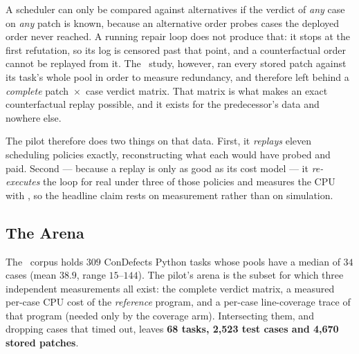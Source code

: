 A scheduler can only be compared against alternatives if the verdict of
\emph{any} case on \emph{any} patch is known, because an alternative order
probes cases the deployed order never reached. A running repair loop does not
produce that: it stops at the first refutation, so its log is censored past
that point, and a counterfactual order cannot be replayed from it. The
\cegmem\ study, however, ran every stored patch against its task's whole pool
in order to measure redundancy, and therefore left behind a \emph{complete}
patch~$\times$~case verdict matrix. That matrix is what makes an exact
counterfactual replay possible, and it exists for the predecessor's data and
nowhere else.

The pilot therefore does two things on that data. First, it \emph{replays}
eleven scheduling policies exactly, reconstructing what each would have probed
and paid. Second --- because a replay is only as good as its cost model --- it
\emph{re-executes} the loop for real under three of those policies and
measures the CPU with , so the headline claim rests on
measurement rather than on simulation.

\subsection{The Arena}
\label{sec:pilot-arena}

The \cegmem\ corpus holds $309$ ConDefects Python tasks whose pools have a
median of $34$ cases (mean $38.9$, range $15$--$144$). The pilot's arena is the
subset for which three independent measurements all exist: the complete verdict
matrix, a measured per-case CPU cost of the \emph{reference} program, and a
per-case line-coverage trace of that program (needed only by the coverage
arm). Intersecting them, and dropping cases that timed out, leaves
\textbf{68 tasks, 2{,}523 test cases and 4{,}670 stored patches}.

